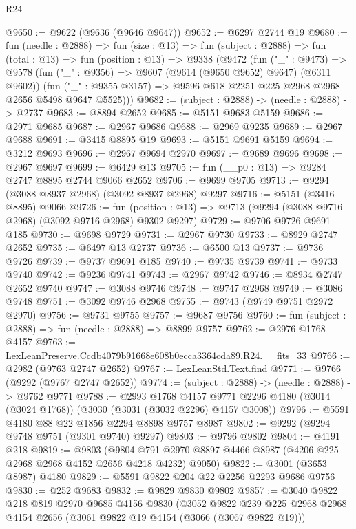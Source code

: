 \begin{lexlean}{R24}
\begin{coremodule}
@9650 := @9622 (@9636 (@9646 @9647))
@9652 := @6297 @2744 @19
@9680 := fun (needle : @2888) =>
  fun (size : @13) =>
  fun (subject : @2888) =>
  fun (total : @13) =>
  fun (position : @13) =>
  @9338
    (@9472
      (fun ("_" : @9473) =>
      @9578
        (fun ("_" : @9356) => @9607 (@9614 (@9650 @9652) @9647) (@6311 @9602))
        (fun ("_" : @9355 @3157) => @9596 @618 @2251 @225 @2968 @2968 @2656 @5498 @9647 @5525)))
@9682 := (subject : @2888) -> (needle : @2888) -> @2737
@9683 := @8894 @2652
@9685 := @5151 @9683 @5159
@9686 := @2971 @9685
@9687 := @2967 @9686
@9688 := @2969 @9235
@9689 := @2967 @9688
@9691 := @3415 @8895 @19
@9693 := @5151 @9691 @5159
@9694 := @3212 @9693
@9696 := @2967 @9694 @2970
@9697 := @9689 @9696
@9698 := @2967 @9697
@9699 := @6429 @13
@9705 := fun (__p0 : @13) => @9284 @2747 @8895 @2744 @9066 @2652
@9706 := @9699 @9705
@9713 := @9294 (@3088 @8937 @2968) (@3092 @8937 @2968) @9297
@9716 := @5151 (@3416 @8895) @9066
@9726 := fun (position : @13) => @9713 (@9294 (@3088 @9716 @2968) (@3092 @9716 @2968) @9302 @9297)
@9729 := @9706 @9726 @9691 @185
@9730 := @9698 @9729
@9731 := @2967 @9730
@9733 := @8929 @2747 @2652
@9735 := @6497 @13 @2737
@9736 := @6500 @13
@9737 := @9736 @9726
@9739 := @9737 @9691 @185
@9740 := @9735 @9739
@9741 := @9733 @9740
@9742 := @9236 @9741
@9743 := @2967 @9742
@9746 := @8934 @2747 @2652 @9740
@9747 := @3088 @9746
@9748 := @9747 @2968
@9749 := @3086 @9748
@9751 := @3092 @9746 @2968
@9755 := @9743 (@9749 @9751 @2972 @2970)
@9756 := @9731 @9755
@9757 := @9687 @9756
@9760 := fun (subject : @2888) => fun (needle : @2888) => @8899 @9757
@9762 := @2976 @1768 @4157
@9763 := LexLeanPreserve.Ccdb4079b91668e608b0ecca3364cda89.R24.__fits_33
@9766 := @2982 (@9763 @2747 @2652)
@9767 := LexLeanStd.Text.find
@9771 := @9766 (@9292 (@9767 @2747 @2652))
@9774 := (subject : @2888) -> (needle : @2888) -> @9762 @9771
@9788 := @2993
    @1768
    @4157
    @9771
    @2296
    @4180
    (@3014 (@3024 @1768))
    (@3030 (@3031 (@3032 @2296) @4157 @3008))
@9796 := @5591 @4180 @88 @22 @1856 @2294 @8898 @9757 @8987
@9802 := @9292 (@9294 @9748 @9751 (@9301 @9740) @9297)
@9803 := @9796 @9802
@9804 := @4191 @218
@9819 := @9803
    (@9804 @791 @2970 @8897 @4466 @8987 (@4206 @225 @2968 @2968 @4152 @2656 @4218 @4232) @9050)
@9822 := @3001 (@3653 @8987) @4180
@9829 := @5591 @9822 @204 @22 @2256 @2293 @9686 @9756
@9830 := @252 @9683
@9832 := @9829 @9830 @9802
@9857 := @3040
    @9822
    @218
    @819
    @2970
    @9685
    @4156
    @9830
    (@3052
      @9822
      @239
      @225
      @2968
      @2968
      @4154
      @2656
      (@3061 @9822 @19 @4154 (@3066 (@3067 @9822 @19)))

\end{coremodule}
\end{lexlean}
